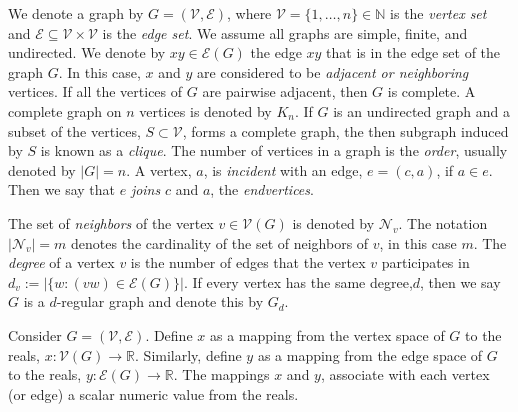 \documentclass{amsart}
\theoremstyle{definition}
\theoremstyle{remark}
\numberwithin{equation}{section}
\def\cV{\mathcal{V}}
\begin{document}
\medskip

We denote a graph by $G = (\mathcal{V},\mathcal{E})$, where $\mathcal{V} = \{1,\ldots, n\} \in \mathbb{N}$ is the \textit{vertex set} and $\mathcal{E} \subseteq \mathcal{V} \times \mathcal{V}$ is the \textit{edge set}. We assume all graphs are simple, finite, and undirected.  We denote by $xy \in \mathcal{E}(G)$ the edge $xy$ that is in the edge set of the graph $G$. In this case, $x$ and $y$ are considered to be \textit{adjacent or neighboring} vertices.  If all the vertices of $G$ are pairwise adjacent, then $G$ is complete.  A complete graph on $n$ vertices is denoted by $K_n$.  If $G$ is an undirected graph and a subset of the vertices, $S \subset \cV$, forms a complete graph, the then subgraph induced by $S$ is known as a \textit{clique}. The number of vertices in a graph is the \textit{order}, usually denoted by $|G|=n$. A vertex, $a$, is \textit{incident} with an edge, $e=(c,a)$, if $a \in e$.  Then we say that $e$ \textit{joins} $c$ and $a$, the \textit{endvertices}.

\medskip

The set of \textit{neighbors} of the vertex $v \in \mathcal{V}(G)$ is denoted by $\mathcal{N}_v$. The notation $|\mathcal{N}_v|=m$ denotes the cardinality of the set of neighbors of $v$, in this case $m$. The \textit{degree} of a vertex $v$ is the number of edges that the vertex $v$ participates in $d_v := |\{w: (vw) \in \mathcal{E}(G)\}|$. If every vertex has the same degree,$d$, then we say $G$ is a $d$-regular graph and denote this by $G_d$. 

\medskip

Consider $G = (\mathcal{V},\mathcal{E})$. Define $x$ as a mapping from the vertex space of $G$ to the reals, $x: \mathcal{V}(G) \rightarrow \mathbb{R}$. Similarly, define $y$ as a mapping from the edge space of $G$ to the reals, $y: \mathcal{E}(G) \rightarrow \mathbb{R}$. The mappings $x$ and $y$, associate with each vertex (or edge) a scalar numeric value from the reals. 

\medskip
\end{document}
